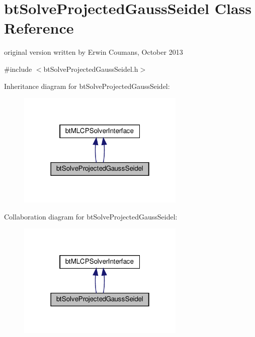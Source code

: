 \hypertarget{classbtSolveProjectedGaussSeidel}{}\section{bt\+Solve\+Projected\+Gauss\+Seidel Class Reference}
\label{classbtSolveProjectedGaussSeidel}


original version written by Erwin Coumans, October 2013  




{\ttfamily \#include $<$bt\+Solve\+Projected\+Gauss\+Seidel.\+h$>$}



Inheritance diagram for bt\+Solve\+Projected\+Gauss\+Seidel\+:
\nopagebreak
\begin{figure}[H]
\begin{center}
\leavevmode
\includegraphics[width=226pt]{classbtSolveProjectedGaussSeidel__inherit__graph}
\end{center}
\end{figure}


Collaboration diagram for bt\+Solve\+Projected\+Gauss\+Seidel\+:
\nopagebreak
\begin{figure}[H]
\begin{center}
\leavevmode
\includegraphics[width=226pt]{classbtSolveProjectedGaussSeidel__coll__graph}
\end{center}
\end{figure}
